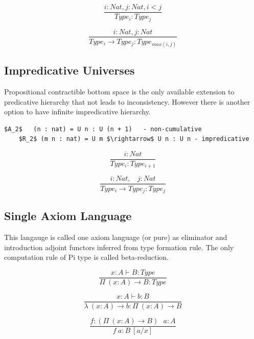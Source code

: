 \documentclass[11pt,oneside]{article}
\begin{document}
\[
\tag{$A_1$}
\dfrac{i: Nat, j: Nat, i < j}{Type_i : Type_j}
\]

\[
\tag{$R_1$}
\dfrac{i : Nat, j : Nat}{Type_i \rightarrow Type_j : Type_{max(i,j)} }
\]

\subsection{Impredicative Universes}
Propositional contractible bottom space is the only
available extension to predicative hierarchy that not leads to inconsistency.
However there is another option to have infinite
impredicative hierarchy.

\vspace{0.5cm}
\begin{lstlisting}[mathescape=true]
    $A_2$   (n : nat) = U n : U (n + 1)   - non-cumulative
    $R_2$ (m n : nat) = U m $\rightarrow$ U n : U n - impredicative
\end{lstlisting}

\begin{equation}
\tag{$A_2$}
\dfrac
{i: Nat}
{Type_i : Type_{i+1}}
\end{equation}

\begin{equation}
\tag{$R_2$}
\dfrac
{i : Nat,\ \ \ \ j : Nat}
{Type_i \rightarrow Type_{j} : Type_{j}}
\end{equation}

\subsection{Single Axiom Language}

This langauge is called one axiom language (or pure) as eliminator
and introduction adjoint functors inferred from type formation rule.
The only computation rule of Pi type is called beta-reduction.

\begin{equation}
\tag{$\Pi$-formation}
\dfrac
{x:A \vdash B : Type}
{\Pi\ (x:A) \rightarrow B : Type}
\end{equation}

\begin{equation}
\tag{$\lambda$-intro}
\dfrac
{x:A \vdash b : B}
{\lambda\ (x:A) \rightarrow b : \Pi\ (x: A) \rightarrow B }
\end{equation}

\begin{equation}
\tag{$App$-elimination}
\dfrac
{f: (\Pi\ (x:A) \rightarrow B)\ \ \ a: A}
{f\ a : B\ [a/x]}
\end{equation}
\end{document}

